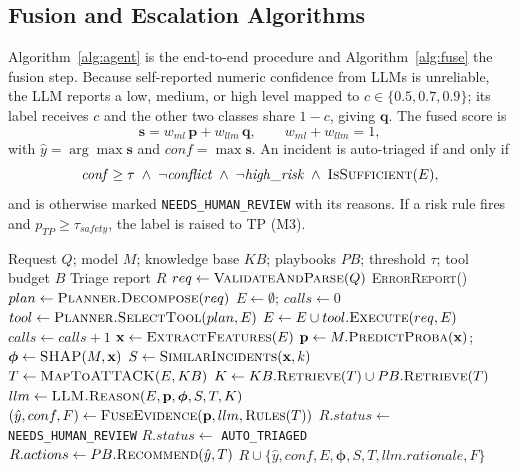 \documentclass[conference]{IEEEtran}
\begin{document}
\subsection{Fusion and Escalation Algorithms}
Algorithm~\ref{alg:agent} is the end-to-end procedure and
Algorithm~\ref{alg:fuse} the fusion step. Because self-reported numeric
confidence from LLMs is unreliable, the LLM reports a low, medium, or
high level mapped to $c\in\{0.5,0.7,0.9\}$; its label receives $c$ and
the other two classes share $1-c$, giving $\mathbf{q}$. The fused score
is
\begin{equation}
\mathbf{s} = w_{ml}\,\mathbf{p} + w_{llm}\,\mathbf{q},\qquad
w_{ml}+w_{llm}=1,
\label{eq:fuse}
\end{equation}
with $\hat{y}=\arg\max\mathbf{s}$ and $\mathit{conf}=\max\mathbf{s}$.
An incident is auto-triaged if and only if
\begin{equation}
\mathit{conf}\ge\tau \;\wedge\; \neg\mathit{conflict} \;\wedge\;
\neg\mathit{high\_risk} \;\wedge\; \textsc{IsSufficient}(E),
\label{eq:esc}
\end{equation}
and is otherwise marked \texttt{NEEDS\_HUMAN\_REVIEW} with its reasons.
If a risk rule fires and $p_{TP}\ge\tau_{safety}$, the label is raised
to TP (M3).

\begin{algorithm}[t]
\caption{SOC Triage Agent}
\label{alg:agent}
\footnotesize
\begin{algorithmic}[1]
\Require Request $Q$; model $M$; knowledge base $KB$; playbooks $PB$;
threshold $\tau$; tool budget $B$
\Ensure Triage report $R$
\State $req \gets \textsc{ValidateAndParse}(Q)$
 \Return \textsc{ErrorReport}() \EndIf
\State $plan \gets \textsc{Planner.Decompose}(req)$
\State $E \gets \emptyset$;\; $calls \gets 0$
\Repeat {}
  \State $tool \gets \textsc{Planner.SelectTool}(plan, E)$
  \State $E \gets E \cup tool.\textsc{Execute}(req, E)$ 
  \State $calls \gets calls + 1$
\State $\mathbf{x} \gets \textsc{ExtractFeatures}(E)$
\State $\mathbf{p} \gets M.\textsc{PredictProba}(\mathbf{x})$;\;
       $\boldsymbol{\phi} \gets \textsc{SHAP}(M,\mathbf{x})$
\State $S \gets \textsc{SimilarIncidents}(\mathbf{x}, k)$
\State $T \gets \textsc{MapToATTACK}(E, KB)$
\State $K \gets KB.\textsc{Retrieve}(T) \cup PB.\textsc{Retrieve}(T)$
\State $llm \gets \textsc{LLM.Reason}(E,\mathbf{p},\boldsymbol{\phi},S,T,K)$
\State $(\hat{y}, conf, F) \gets \textsc{FuseEvidence}(\mathbf{p}, llm, \textsc{Rules}(T))$
  \State $R.status \gets$ \texttt{NEEDS\_HUMAN\_REVIEW}
\Else
  \State $R.status \gets$ \texttt{AUTO\_TRIAGED}
\EndIf
\State $R.actions \gets PB.\textsc{Recommend}(\hat{y}, T)$
\State \Return $R \cup \{\hat{y}, conf, E, \boldsymbol{\phi}, S, T, llm.rationale, F\}$
\end{algorithmic}
\end{algorithm}
\end{document}

